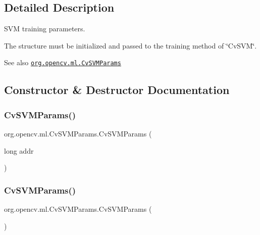 \subsection{Detailed Description}
S\+VM training parameters.

The structure must be initialized and passed to the training method of \char`\"{}\+Cv\+S\+V\+M\char`\"{}.

\begin{DoxySeeAlso}{See also}
\href{http://docs.opencv.org/modules/ml/doc/support_vector_machines.html#cvsvmparams}{\tt org.\+opencv.\+ml.\+Cv\+S\+V\+M\+Params} 
\end{DoxySeeAlso}


\subsection{Constructor \& Destructor Documentation}
\mbox{\label{classorg_1_1opencv_1_1ml_1_1_cv_s_v_m_params_ae098dd5eff6677f8328c6cf3b0871264}} 
\subsubsection{\texorpdfstring{Cv\+S\+V\+M\+Params()}{CvSVMParams()}\hspace{0.1cm}{\footnotesize\ttfamily [1/2]}}
{\footnotesize\ttfamily org.\+opencv.\+ml.\+Cv\+S\+V\+M\+Params.\+Cv\+S\+V\+M\+Params (\begin{DoxyParamCaption}\item[{long}]{addr }\end{DoxyParamCaption})\hspace{0.3cm}{\ttfamily [protected]}}

\mbox{\label{classorg_1_1opencv_1_1ml_1_1_cv_s_v_m_params_a49f85755379935bb245135021158de9a}} 
\subsubsection{\texorpdfstring{Cv\+S\+V\+M\+Params()}{CvSVMParams()}\hspace{0.1cm}{\footnotesize\ttfamily [2/2]}}
{\footnotesize\ttfamily org.\+opencv.\+ml.\+Cv\+S\+V\+M\+Params.\+Cv\+S\+V\+M\+Params (\begin{DoxyParamCaption}{ }\end{DoxyParamCaption})}


